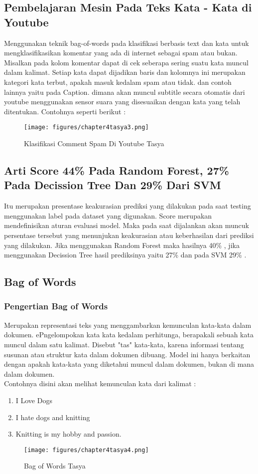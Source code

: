 \subsection{Pembelajaran Mesin Pada Teks Kata - Kata di Youtube}
Menggunakan teknik bag-of-words pada klasifikasi berbasis text dan kata untuk mengklasifikasikan komentar yang ada di internet sebagai spam atau bukan. Misalkan pada kolom komentar dapat di cek seberapa sering suatu kata muncul dalam kalimat. Setiap kata dapat dijadikan baris dan kolomnya ini merupakan kategori kata terbut, apakah masuk kedalam spam atau tidak. dan contoh lainnya yaitu pada Caption. dimana akan muncul subtitle secara otomatis dari youtube menggunakan sensor suara yang disesuaikan dengan kata yang telah ditentukan. Contohnya seperti berikut :
\begin{figure}[ht]
\centering
\texttt{[image: figures/chapter4tasya3.png]}
\caption{Klasifikasi Comment Spam Di Youtube Tasya}
\label{Contoh}
\end{figure}

\subsection{Arti Score 44\% Pada Random Forest, 27\% Pada Decission Tree Dan 29\% Dari SVM}
Itu merupakan presentase keakurasian prediksi yang dilakukan pada saat testing menggunakan label pada dataset yang digunakan. Score merupakan mendefinisikan aturan evaluasi model. Maka pada saat dijalankan akan muncuk persentase tersebut yang menunjukan keakurasian atau keberhasilan dari prediksi yang dilakukan. Jika menggunakan Random Forest maka hasilnya 40\% , jika menggunakan Decission Tree hasil prediksinya yaitu 27\% dan pada SVM 29\% .

\subsection{Bag of Words}
\subsubsection{Pengertian Bag of Words}
Merupakan representasi teks yang menggambarkan kemunculan kata-kata dalam dokumen. ePngelompokan kata kata kedalam perhitunga, berapakali sebuah kata muncul dalam satu kalimat. Disebut "tas" kata-kata, karena informasi tentang susunan atau struktur kata dalam dokumen dibuang. Model ini hanya berkaitan dengan apakah kata-kata yang diketahui muncul dalam dokumen, bukan di mana dalam dokumen.\\
Contohnya disini akan melihat kemunculan kata dari kalimat :
\begin{enumerate}
\item I Love Dogs
\item I hate dogs and knitting
\item Knitting is my hobby and passion.
\end{enumerate}
\begin{figure}[ht]
\centering
\texttt{[image: figures/chapter4tasya4.png]}
\caption{Bag of Words Tasya}
\label{Contoh}
\end{figure}

